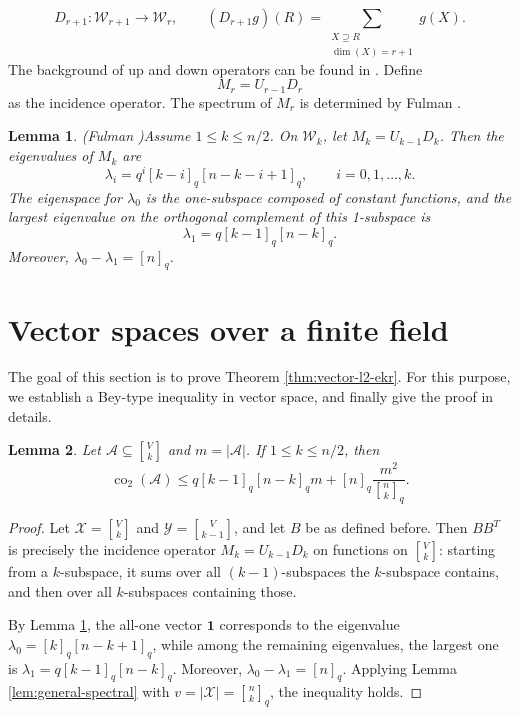 \documentclass[11pt]{article}
\newtheorem{lemma}{Lemma}
\theoremstyle{definition}
\newcommand{\Gr}[2]{\genfrac{[}{]}{0pt}{}{#1}{#2}}
\newcommand{\qbinom}[2]{\genfrac{[}{]}{0pt}{}{#1}{#2}_q}
\newcommand{\co}{\operatorname{co}_2}
\begin{document}
\[
D_{r+1}:\mathcal W_{r+1}\to\mathcal W_r,
\qquad
(D_{r+1}g)(R)=\sum_{\substack{X\supseteq R\\ \dim (X)=r+1}}g(X).
\]
The background of up and down operators can be found in \cite{Stanley1991}. Define 
$$M_r=U_{r-1}D_r$$
as the incidence operator.  
The spectrum of $M_r$ is determined by Fulman \cite{Fulman2009}. 
\begin{lemma}(Fulman \cite{Fulman2009})\label{prop:grassmann-spectrum}
Assume $1\le k\le n/2$.  On $\mathcal W_k$, let $M_k=U_{k-1}D_k$. Then the eigenvalues of $M_k$ are
\[
    \lambda_i=q^i[k-i]_q[n-k-i+1]_q,
\qquad i=0,1,\ldots,k.
\]
The eigenspace for $\lambda_0$ is the one-subspace composed of constant functions, and the largest eigenvalue on the orthogonal complement of this 1-subspace is
\[
    \lambda_1=q[k-1]_q[n-k]_q.
\]
Moreover, $\lambda_0-\lambda_1=[n]_q$.
\end{lemma}


\section{Vector spaces over a finite field}
 
The goal of this section is to prove Theorem \ref{thm:vector-l2-ekr}. For this purpose, we establish a Bey-type inequality in vector space, and finally give the proof in details.  

\begin{lemma}\label{lem:vector-bey}
Let $\mathcal A\subseteq\Gr{V}{k}$ and $m=|\mathcal A|$.  If $1\le k\le n/2$, then
\[
\co(\mathcal A)\le q[k-1]_q[n-k]_qm+[n]_q\frac{m^2}{\qbinom{n}{k}}.
\]
\end{lemma}

\begin{proof}
Let $\mathscr{X}=\Gr{V}{k}$ and $\mathscr{Y}=\Gr{V}{k-1}$, and let $B$ be as defined before. Then $BB^T$ is precisely the incidence operator $M_k=U_{k-1}D_k$ on functions on $\Gr{V}{k}$: starting from a $k$-subspace, it sums over all $(k-1)$-subspaces the $k$-subspace contains, and then over all $k$-subspaces containing those.

By Lemma \ref{prop:grassmann-spectrum}, the all-one vector $\mathbf{1}$ corresponds to the eigenvalue $\lambda_0=[k]_q[n-k+1]_q$, while among the remaining eigenvalues, the largest one is $\lambda_1=q[k-1]_q[n-k]_q$. Moreover, $\lambda_0-\lambda_1=[n]_q$.  Applying Lemma \ref{lem:general-spectral} with $v=|\mathscr{X}|=\qbinom{n}{k}$, the inequality holds.
\end{proof}
\end{document}
